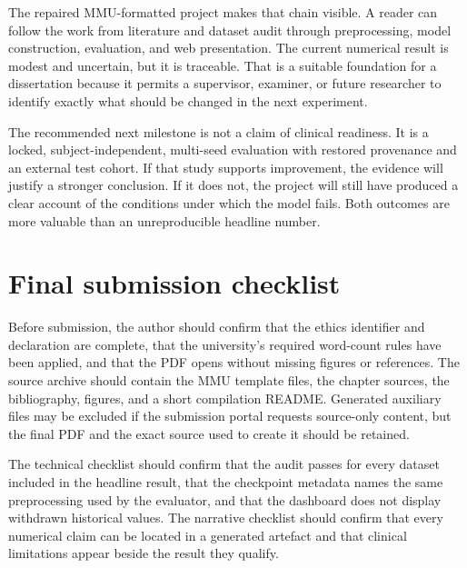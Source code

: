 The repaired MMU-formatted project makes that chain visible. A reader can follow the work from literature and dataset audit through preprocessing, model construction, evaluation, and web presentation. The current numerical result is modest and uncertain, but it is traceable. That is a suitable foundation for a dissertation because it permits a supervisor, examiner, or future researcher to identify exactly what should be changed in the next experiment.

The recommended next milestone is not a claim of clinical readiness. It is a locked, subject-independent, multi-seed evaluation with restored provenance and an external test cohort. If that study supports improvement, the evidence will justify a stronger conclusion. If it does not, the project will still have produced a clear account of the conditions under which the model fails. Both outcomes are more valuable than an unreproducible headline number.

\section{Final submission checklist}
Before submission, the author should confirm that the ethics identifier and declaration are complete, that the university's required word-count rules have been applied, and that the PDF opens without missing figures or references. The source archive should contain the MMU template files, the chapter sources, the bibliography, figures, and a short compilation README. Generated auxiliary files may be excluded if the submission portal requests source-only content, but the final PDF and the exact source used to create it should be retained.

The technical checklist should confirm that the audit passes for every dataset included in the headline result, that the checkpoint metadata names the same preprocessing used by the evaluator, and that the dashboard does not display withdrawn historical values. The narrative checklist should confirm that every numerical claim can be located in a generated artefact and that clinical limitations appear beside the result they qualify.
